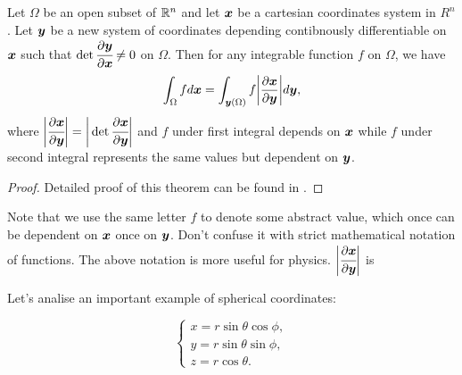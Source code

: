 \documentclass[main.tex]{subfiles}
\begin{document}
\begin{theorem} 
Let $\Omega$ be an open subset of $\mathbb{R}^n$ and let $\boldsymbol{x}$ be a cartesian coordinates system in $R^n$. Let $\boldsymbol{y}$ be a new system of coordinates depending contibnously differentiable on $\boldsymbol{x}$ such that $\det \cfrac{\partial \boldsymbol{y}}{\partial \boldsymbol{x}} \not = 0$ on $\Omega$.
Then for any integrable function $f$ on $\Omega$, we have
\begin{equation}
\int_{\Omega} f d\boldsymbol{x} = \int_{\boldsymbol{y}(\Omega)} f \bigg|\frac{\partial \boldsymbol{x}}{\partial \boldsymbol{y}}\bigg| d\boldsymbol{y},
\end{equation}
where  $\bigg|\cfrac{\partial \boldsymbol{x}}{\partial \boldsymbol{y}}\bigg| = \bigg|\det \cfrac{\partial \boldsymbol{x}}{\partial \boldsymbol{y}}\bigg|$ and $f$ under first integral depends on $\boldsymbol{x}$ while $f$ under second integral represents the same values but dependent on $\boldsymbol{y}$.
\end{theorem}
\begin{proof}
Detailed proof of this theorem can be found in \cite{spivak1995}.
\end{proof}
Note that we use the same letter $f$ to denote some abstract value, which once can be dependent on $\boldsymbol{x}$ once on $\boldsymbol{y}$. Don't confuse it with strict mathematical notation of functions. The above notation is more useful for physics.
$\bigg|\cfrac{\partial \boldsymbol{x}}{\partial \boldsymbol{y}}\bigg|$ is 

Let's analise an important example of spherical coordinates:

\begin{equation}
\begin{cases}
x = r\sin\theta \cos\phi,\\
y = r\sin\theta \sin\phi,\\
z = r\cos\theta.
\end{cases}
\end{equation}
\end{document}
